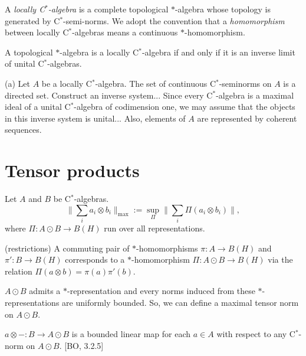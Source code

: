 \documentclass{../../large}
\begin{document}
\begin{prb}
A \emph{locally C$^*$-algebra} is a complete topological $*$-algebra whose topology is generated by C$^*$-semi-norms.
We adopt the convention that a \emph{homomorphism} between locally C$^*$-algebras means a continuous $*$-homomorphism.
\begin{parts}
\item A topological $*$-algebra is a locally C$^*$-algebra if and only if it is an inverse limit of unital C$^*$-algebras.
\end{parts}
\end{prb}
\begin{pf}
(a)
Let $A$ be a locally C$^*$-algebra.
The set of continuous C$^*$-seminorms on $A$ is a directed set.
Construct an inverse system...
Since every C$^*$-algebra is a maximal ideal of a unital C$^*$-algebra of codimension one, we may assume that the objects in this inverse system is unital...
Also, elements of $A$ are represented by coherent sequences.
\end{pf}



\section{Tensor products}




\begin{prb}
Let $A$ and $B$ be C$^*$-algebras.
\[\|\sum_ia_i\otimes b_i\|_{\max}:=\sup_\Pi\|\sum_i\Pi(a_i\otimes b_i)\|,\]
where $\Pi:A\odot B\to B(H)$ run over all representations.
\begin{parts}
\item (restrictions) A commuting pair of $*$-homomorphisms $\pi:A\to B(H)$ and $\pi':B\to B(H)$ corresponds to a $*$-homomorphism $\Pi:A\odot B\to B(H)$ via the relation $\Pi(a\otimes b)=\pi(a)\pi'(b)$.
\item $A\odot B$ admits a $*$-representation and every norms induced from these $*$-representations are uniformly bounded. So, we can define a maximal tensor norm on $A\odot B$.
\item $a\otimes-:B\to A\odot B$ is a bounded linear map for each $a\in A$ with respect to any C$^*$-norm on $A\odot B$. [BO, 3.2.5]
\end{parts}
\end{prb}
\end{document}
